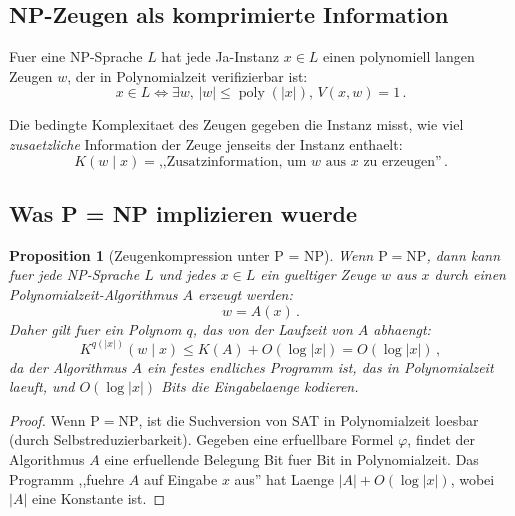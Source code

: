 \documentclass[aps,prd,twocolumn,superscriptaddress,nofootinbib]{revtex4-2}
\newtheorem{proposition}[theorem]{Proposition}
\theoremstyle{definition}
\theoremstyle{remark}
\DeclareMathOperator{\poly}{poly}
\newcommand{\NP}{\mathrm{NP}}
\newcommand{\PP}{\mathrm{P}}
\begin{document}
\subsection{NP-Zeugen als komprimierte Information}

Fuer eine NP-Sprache $L$ hat jede Ja-Instanz $x \in L$ einen polynomiell langen Zeugen $w$, der in Polynomialzeit verifizierbar ist:
\begin{equation}
x \in L \iff \exists w,\, |w| \leq \poly(|x|),\, V(x, w) = 1\,.
\end{equation}

Die bedingte Komplexitaet des Zeugen gegeben die Instanz misst, wie viel \textit{zusaetzliche} Information der Zeuge jenseits der Instanz enthaelt:
\begin{equation}
K(w \mid x) = \text{,,Zusatzinformation, um } w \text{ aus } x \text{ zu erzeugen''}\,.
\end{equation}

\subsection{Was P = NP implizieren wuerde}

\begin{proposition}[Zeugenkompression unter P = NP]
\label{prop:compression}
Wenn $\PP = \NP$, dann kann fuer jede NP-Sprache $L$ und jedes $x \in L$ ein gueltiger Zeuge $w$ aus $x$ durch einen Polynomialzeit-Algorithmus $A$ erzeugt werden:
\begin{equation}
w = A(x)\,.
\end{equation}
Daher gilt fuer ein Polynom $q$, das von der Laufzeit von $A$ abhaengt:
\begin{equation}
K^{q(|x|)}(w \mid x) \leq K(A) + O(\log|x|) = O(\log|x|)\,,
\label{eq:compression}
\end{equation}
da der Algorithmus $A$ ein festes endliches Programm ist, das in Polynomialzeit laeuft, und $O(\log|x|)$ Bits die Eingabelaenge kodieren.
\end{proposition}

\begin{proof}
Wenn $\PP = \NP$, ist die Suchversion von SAT in Polynomialzeit loesbar (durch Selbstreduzierbarkeit). Gegeben eine erfuellbare Formel $\varphi$, findet der Algorithmus $A$ eine erfuellende Belegung Bit fuer Bit in Polynomialzeit. Das Programm ,,fuehre $A$ auf Eingabe $x$ aus'' hat Laenge $|A| + O(\log|x|)$, wobei $|A|$ eine Konstante ist.
\end{proof}
\end{document}
